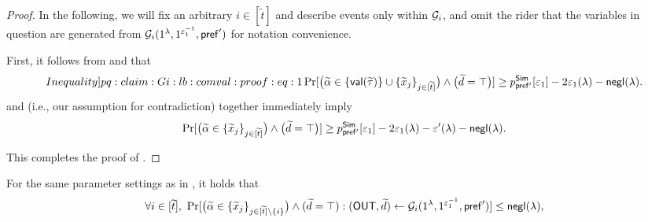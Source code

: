 \begin{proof}
In the following, we will fix an arbitrary $i \in [\tilde{t}]$ and describe events only within $\mathcal{G}_i$, and omit the rider that the variables in question are generated from $\mathcal{G}_i(1^\lambda, 1^{\varepsilon_1^{-1}},  \mathsf{pref}')$ for notation convenience. 

First, it follows from  and  that
\begin{equation}\label[Inequality]{pq:claim:Gi:lb:comval:proof:eq:1}
\Pr[\big(\tilde{\alpha} \in \Set{\msf{val}(\tilde{\tau})} \cup \Set{\tilde{x}_j}_{j \in [\tilde{t}]}\big) \wedge \big( \tilde{d} = \top\big)] \ge  p^{\msf{Sim}}_{\msf{pref'}}[\epsilon_1] - 2\epsilon_1(\secpar) -\negl(\secpar).
\end{equation}
 and  (i.e., our assumption for contradiction) together immediately imply
\begin{equation}
\Pr[\big(\widetilde{\alpha} \in  \{\widetilde{x}_j\}_{j \in [\widetilde{t}]}\big) \wedge \big( \widetilde{d} = \top\big)] \ge  p^{\mathsf{Sim}}_{\mathsf{pref'}}[\varepsilon_1] - 2\varepsilon_1(\lambda) - \varepsilon'(\lambda) -\mathsf{negl}(\lambda).
\end{equation}

This completes the proof of .

\end{proof}





\begin{MyClaim}\label{pq:claim:Gi:vss-hide}
For the same parameter settings as in , it holds that
$$\forall i \in [\widetilde{t}],~\Pr[\big(\widetilde{\alpha} \in \{\widetilde{x}_j\}_{j \in [\widetilde{t}] \setminus \{i\}}\big) \wedge (\widetilde{d} = \top): (\mathsf{OUT},\widetilde{d}) \gets \mathcal{G}_i(1^\lambda, 1^{\varepsilon_1^{-1}},  \mathsf{pref}')] \leq \mathsf{negl}(\lambda) ,$$
\end{MyClaim}

